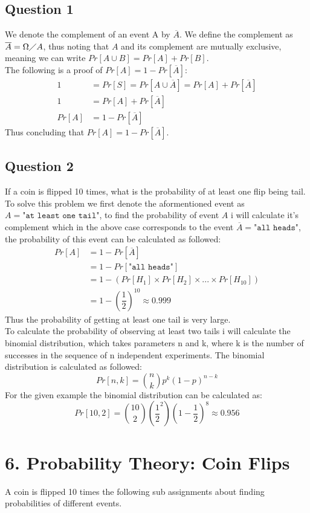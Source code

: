 \documentclass{article}
\begin{document}
\subsection{Question 1}
We denote the complement of an event A by $\overline{A}$. We define the complement as $\overline{A} = \Omega \diagup A$, thus noting that $A$ and its complement are mutually exclusive, meaning we can write $Pr[A\cup B] = Pr[A] + Pr[B]$. \\
The following is a proof of $Pr[A] = 1 - Pr[\overline{A}]$:
\begin{align*}
1 &= Pr[S] = Pr[A \cup \overline{A}] = Pr[A]+ Pr[\overline{A}] \\
1 &= Pr[A]+ Pr[\overline{A}] \\
Pr[A] &= 1 - Pr[\overline{A}]
\end{align*}
Thus concluding that $Pr[A] = 1 - Pr[\overline{A}]$.
\subsection{Question 2}
If a coin is flipped 10 times, what is the probability of at least one flip being tail. To solve this problem we first denote the aformentioned event as $A = \texttt{"at least one tail"}$, to find the probability of event $A$ i will calculate it's complement which in the above case corresponds to the event $\overline{A} = \texttt{"all heads"}$, the probability of this event can be calculated as followed:
\begin{align}
Pr[A] &= 1-Pr[\overline{A}] \\
&= 1-Pr[\texttt{"all heads"}] \\
&= 1 - \left( Pr[H_1] \times Pr[H_2] \times ... \times Pr[H_{10}] \right) \\
&= 1 - \left( \dfrac{1}{2} \right)^{10} \approx 0.999
\end{align}
Thus the probability of getting at least one tail is very large. \\
To calculate the probability of observing at least two tails i will calculate the binomial distribution, which takes parameters n and k, where k is the number of successes in the sequence of n independent experiments. The binomial distribution is calculated as followed:
$$
Pr[n,k] = \binom{n}{k}p^k(1-p)^{n-k}
$$
For the given example the binomial distribution can be calculated as:
$$
Pr[10,2] = \binom{10}{2} \left(\dfrac{1}{2}^2\right)\left(1-\dfrac{1}{2}\right)^8
\approx 0.956
$$
\section{6. Probability Theory: Coin Flips}
A coin is flipped 10 times the following sub assignments about finding probabilities of different events.
\end{document}
